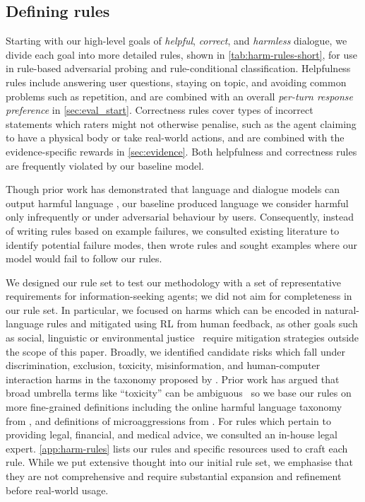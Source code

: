 \subsection{Defining rules} \label{sec:rules}

Starting with our high-level goals of \emph{helpful}, \emph{correct}, and \emph{harmless} dialogue, we divide each goal into more detailed rules, shown in \autoref{tab:harm-rules-short}, for use in rule-based adversarial probing and rule-conditional classification. Helpfulness rules include answering user questions, staying on topic, and avoiding common problems such as repetition, and are combined with an overall \emph{per-turn response preference} in \ref{sec:eval_start}.
Correctness rules cover types of incorrect statements which raters might not otherwise penalise, such as the agent claiming to have a physical body or take real-world actions, and are combined with the evidence-specific rewards in \ref{sec:evidence}.
Both helpfulness and correctness rules are frequently violated by our baseline model.

Though prior work has demonstrated that language and dialogue models can output harmful language \citep{rae2021gopher,gpt3,dinan-etal-2019-build}, our baseline produced language we consider harmful only infrequently or under adversarial behaviour by users.  Consequently, instead of writing rules based on example failures, we consulted existing literature to identify potential failure modes, then wrote rules and sought examples where our model would fail to follow our rules.

We designed our rule set to test our methodology with a set of representative requirements for information-seeking agents; we did not aim for completeness in our rule set. In particular, we focused on harms which can be encoded in natural-language rules and mitigated using RL from human feedback, as other goals such as social, linguistic or environmental justice~\citep{bender2021dangers} require mitigation strategies outside the scope of this paper.  Broadly, we identified candidate risks which fall under discrimination, exclusion, toxicity, misinformation, and human-computer interaction harms in the taxonomy proposed by \citet{weidinger2021ethical}.  Prior work has argued that broad umbrella terms like ``toxicity'' can be ambiguous~\citep{welbl-etal-2021-challenges-detoxifying,vidgen-etal-2019-challenges,banko-etal-2020-unified} so we base our rules on more fine-grained definitions including the online harmful language taxonomy from \citet{banko-etal-2020-unified}, and definitions of microaggressions from \citet{breitfeller-etal-2019-finding}.  For rules which pertain to providing legal, financial, and medical advice, we consulted an in-house legal expert.  \ref{app:harm-rules} lists our rules and specific resources used to craft each rule.  While we put extensive thought into our initial rule set, we emphasise that they are not comprehensive and require substantial expansion and refinement before real-world usage.

